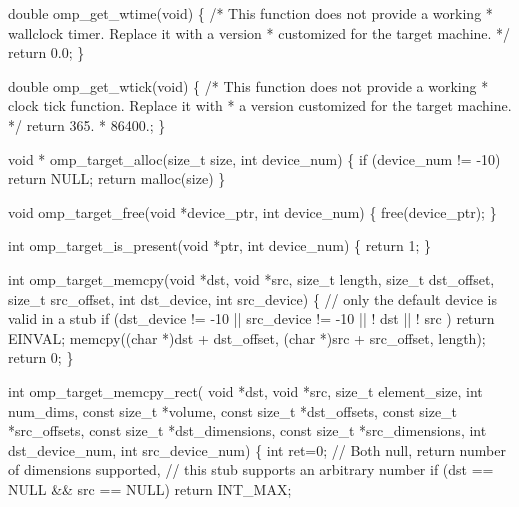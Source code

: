 {\begin{codepar}
double omp\_get\_wtime(void)
\{
/* This function does not provide a working
 * wallclock timer. Replace it with a version
 * customized for the target machine.
 */
    return 0.0;
\}

double omp\_get\_wtick(void)
\{
/* This function does not provide a working
 * clock tick function. Replace it with
 * a version customized for the target machine.
 */
    return 365. * 86400.;
\}

void * omp\_target\_alloc(size\_t size, int device\_num)
\{
    if (device\_num != -10)
      return NULL;
    return malloc(size)
\}

void omp\_target\_free(void *device\_ptr, int device\_num)
\{
    free(device\_ptr);
\}

int omp\_target\_is\_present(void *ptr, int device\_num)
\{
    return 1;
\}

int omp\_target\_memcpy(void *dst, void *src, size\_t length,
                      size\_t dst\_offset, size\_t src\_offset,
                      int dst\_device, int src\_device)
\{
    // only the default device is valid in a stub
    if (dst\_device != -10 || src\_device != -10
            || ! dst || ! src )
        return EINVAL;
    memcpy((char *)dst + dst\_offset,
           (char *)src + src\_offset,
           length);
    return 0;
\}

int omp\_target\_memcpy\_rect(
    void *dst, void *src,
    size\_t element\_size,
    int num\_dims,
    const size\_t *volume,
    const size\_t *dst\_offsets,
    const size\_t *src\_offsets,
    const size\_t *dst\_dimensions,
    const size\_t *src\_dimensions,
    int dst\_device\_num, int src\_device\_num)
\{
    int ret=0;
    // Both null, return number of dimensions supported,
    // this stub supports an arbitrary number
    if (dst == NULL && src == NULL) return INT\_MAX;


\end{codepar}}
